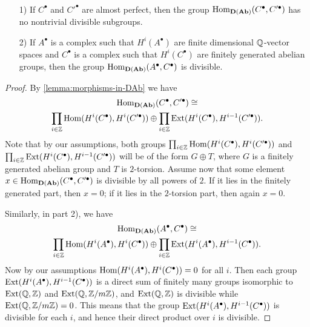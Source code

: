 \begin{lemma}
  \label{lemma:morphisms-inDAb-not-divisible} ~

  \begin{enumerate}
  \item[1)] If $C^\bullet$ and $C'^\bullet$ are almost perfect, then the group
    $\operatorname{Hom}_{\text{\bf D} (\text{\bf Ab})} (C^\bullet, C'^\bullet)$ has no nontrivial
    divisible subgroups.

  \item[2)] If $A^\bullet$ is a complex such that $H^i (A^\bullet)$ are finite
    dimensional $\mathbb{Q}$-vector spaces and $C^\bullet$ is a complex such that
    $H^i (C^\bullet)$ are finitely generated abelian groups, then the group
    $\operatorname{Hom}_{\text{\bf D} (\text{\bf Ab})} (A^\bullet, C^\bullet)$ is divisible.
  \end{enumerate}

  \begin{proof}
    By \ref{lemma:morphisms-in-DAb} we have
    \begin{multline*}
      \operatorname{Hom}_{\text{\bf D} (\text{\bf Ab})} (C^\bullet, C'^\bullet) \cong \\
      \prod_{i\in\mathbb{Z}} \operatorname{Hom} (H^i (C^\bullet), H^i (C'^\bullet)) \oplus
      \prod_{i\in\mathbb{Z}} \operatorname{Ext} (H^i (C^\bullet), H^{i-1} (C'^\bullet)).
    \end{multline*}
    Note that by our assumptions, both groups
    $\prod_{i\in\mathbb{Z}} \operatorname{Hom} (H^i (C^\bullet), H^i (C'^\bullet))$ and
    $\prod_{i\in\mathbb{Z}} \operatorname{Ext} (H^i (C^\bullet), H^{i-1} (C'^\bullet))$ will be of
    the form $G \oplus T$, where $G$ is a finitely generated abelian group and
    $T$ is $2$-torsion. Assume now that some element
    $x \in \operatorname{Hom}_{\text{\bf D} (\text{\bf Ab})} (C^\bullet, C'^\bullet)$ is divisible
    by all powers of $2$. If it lies in the finitely generated part, then
    $x = 0$; if it lies in the $2$-torsion part, then again $x = 0$.

    Similarly, in part 2), we have
    \begin{multline*}
      \operatorname{Hom}_{\text{\bf D} (\text{\bf Ab})} (A^\bullet, C^\bullet) \cong \\
      \prod_{i\in\mathbb{Z}} \operatorname{Hom} (H^i (A^\bullet), H^i (C^\bullet)) \oplus
      \prod_{i\in\mathbb{Z}} \operatorname{Ext} (H^i (A^\bullet), H^{i-1} (C^\bullet)).
    \end{multline*}
    Now by our assumptions $\operatorname{Hom} (H^i (A^\bullet), H^i (C^\bullet)) = 0$ for all
    $i$. Then each group $\operatorname{Ext} (H^i (A^\bullet), H^{i-1} (C^\bullet))$ is a
    direct sum of finitely many groups isomorphic to $\operatorname{Ext} (\mathbb{Q}, \mathbb{Z})$ and
    $\operatorname{Ext} (\mathbb{Q}, \mathbb{Z}/m\mathbb{Z})$, and $\operatorname{Ext} (\mathbb{Q}, \mathbb{Z})$ is divisible while
    $\operatorname{Ext} (\mathbb{Q}, \mathbb{Z}/m\mathbb{Z}) = 0$. This means that the group
    $\operatorname{Ext} (H^i (A^\bullet), H^{i-1} (C^\bullet))$ is divisible for each $i$, and
    hence their direct product over $i$ is divisible.
  \end{proof}
\end{lemma}

